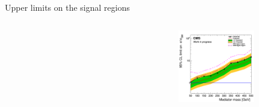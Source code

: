 \documentclass[8pt]{beamer}
\begin{document}
\begin{frame}{Upper limits on the signal regions}
\begin{columns}
\begin{column}{0.33\textwidth}
\begin{center}
    		\end{center}		
		\end{column}
		\begin{column}{0.33\textwidth}
			\begin{center}
     			\includegraphics[width=1.0\textwidth, height=90pt]{figs/limit_pseudo_2018_attempt7.png}
    		\end{center}		
		\end{column}
\end{columns} \vfill
\end{frame}
\end{document}

